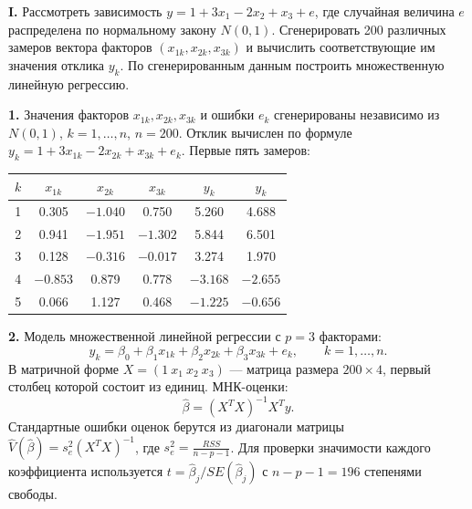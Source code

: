 \documentclass{article}
\begin{document}
\begin{framed}
    \textbf{I.} Рассмотреть зависимость $y=1+3x_1-2x_2+x_3+e$, где случайная величина $e$ распределена
    по нормальному закону $N(0,1)$. Сгенерировать 200 различных замеров вектора факторов
    $(x_{1k},x_{2k},x_{3k})$ и вычислить соответствующие им значения отклика $y_k$. По сгенерированным
    данным построить множественную линейную регрессию.
\end{framed}
    \textbf{1.} Значения факторов $x_{1k},x_{2k},x_{3k}$ и ошибки $e_k$ сгенерированы независимо из $N(0,1)$, $k=1,\dots,n$, $n=200$. Отклик вычислен по формуле $y_k=1+3x_{1k}-2x_{2k}+x_{3k}+e_k$. Первые пять замеров:
    \begin{center}
    \begin{tabular}{|c|c|c|c|c|c|}
        \hline
        $k$ & $x_{1k}$ & $x_{2k}$ & $x_{3k}$ & $y_k$ & $\hat y_k$ \\ \hline
        1 & 0.305 & $-1.040$ & 0.750 & 5.260 & 4.688 \\
        2 & 0.941 & $-1.951$ & $-1.302$ & 5.844 & 6.501 \\
        3 & 0.128 & $-0.316$ & $-0.017$ & 3.274 & 1.970 \\
        4 & $-0.853$ & 0.879 & 0.778 & $-3.168$ & $-2.655$ \\
        5 & 0.066 & 1.127 & 0.468 & $-1.225$ & $-0.656$ \\ \hline
    \end{tabular}
    \end{center}

    \textbf{2.} Модель множественной линейной регрессии с $p=3$ факторами:
    \[y_k=\beta_0+\beta_1x_{1k}+\beta_2x_{2k}+\beta_3x_{3k}+e_k,\qquad k=1,\dots,n.\]
    В матричной форме $X=(1\ x_1\ x_2\ x_3)$ --- матрица размера $200\times4$, первый столбец которой состоит из единиц. МНК-оценки:
    \[\hat\beta=(X^TX)^{-1}X^Ty.\]
    Стандартные ошибки оценок берутся из диагонали матрицы $\hat V(\hat\beta)=s_e^2(X^TX)^{-1}$, где $s_e^2=\frac{RSS}{n-p-1}$. Для проверки значимости каждого коэффициента используется $t=\hat\beta_j/SE(\hat\beta_j)$ с $n-p-1=196$ степенями свободы.
\end{document}

